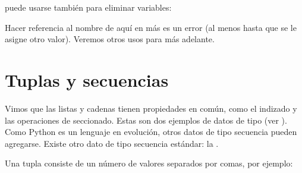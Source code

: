 \documentclass[a5paper,10pt,spanish]{sphinxmanual}
\begin{document}
\begin{sphinxVerbatim}[commandchars=\\\{\}]
  \PYG{p}{[}     \PYG{p}{]}
 \PYG{p}{[}\PYG{p}{]}
 \PYG{p}{[}\PYG{p}{]}
 \PYG{p}{[}\PYG{p}{]}
\end{sphinxVerbatim}

\sphinxAtStartPar
{} puede usarse también para eliminar variables:

\begin{sphinxVerbatim}[commandchars=\\\{\}]
 
\end{sphinxVerbatim}

\sphinxAtStartPar
Hacer referencia al nombre  de aquí en más es un error (al menos hasta que se le asigne otro valor).  Veremos otros usos para  más adelante.


\section{Tuplas y secuencias}
\label{\detokenize{tutorial/datastructures:tuples-and-sequences}}\label{\detokenize{tutorial/datastructures:tut-tuples}}
\sphinxAtStartPar
Vimos que las listas y cadenas tienen propiedades en común, como el indizado y las operaciones de seccionado.  Estas son dos ejemplos de datos de tipo  (ver ).  Como Python es un lenguaje en evolución, otros datos de tipo secuencia pueden agregarse.  Existe otro dato de tipo secuencia estándar: la .

\sphinxAtStartPar
Una tupla consiste de un número de valores separados por comas, por ejemplo:
\end{document}
